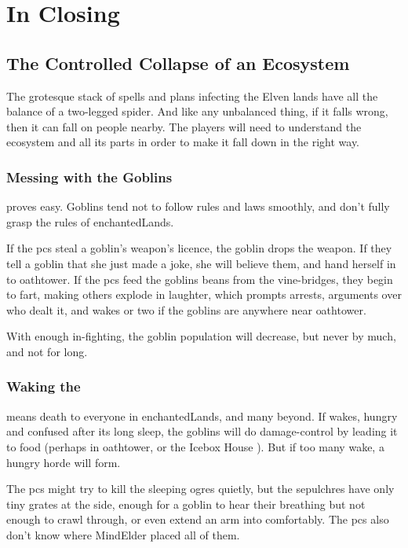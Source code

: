 \section{In Closing}

\begin{multicols}{2}

\subsection{The Controlled Collapse of an Ecosystem}

The grotesque stack of \glspl{spell} and plans infecting the Elven lands have all the balance of a two-legged spider.
And like any unbalanced thing, if it falls wrong, then it can fall on people nearby.
The players will need to understand the ecosystem and all its parts in order to make it fall down in the right way.

\subsubsection{Messing with the Goblins}
proves easy.
Goblins tend not to follow rules and laws smoothly,%
and don't fully grasp the rules of \gls{enchantedLands}.

If the \glspl{pc} steal a goblin's weapon's licence, the goblin drops the weapon.
If they tell a goblin that she just made a joke, she will believe them, and hand herself in to \gls{oathtower}.
If the \glspl{pc} feed the goblins beans from the vine-bridges,
they begin to fart, making others explode in laughter, which prompts arrests, arguments over who dealt it, and wakes  or two if the goblins are anywhere near \gls{oathtower}.

With enough in-fighting, the goblin population will decrease, but never by much, and not for long.

\subsubsection{Waking the }
means death to everyone in \gls{enchantedLands}, and many beyond.
If  wakes, hungry and confused after its long sleep, the goblins will do damage-control by leading it to food (perhaps in \gls{oathtower}, or the Icebox House ).
But if too many wake, a hungry horde will form.

The \glspl{pc} might try to kill the sleeping \glspl{ogre} quietly, but the sepulchres have only tiny grates at the side, enough for a goblin to hear their breathing but not enough to crawl through, or even extend an arm into comfortably.
The \glspl{pc} also don't know where \gls{MindElder} placed all of them.


\end{multicols}
